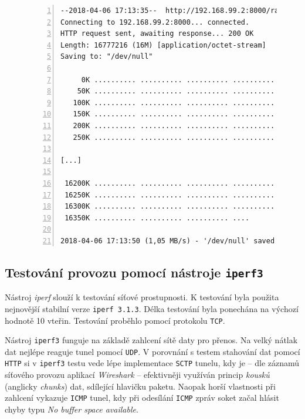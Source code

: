 \documentclass[thesis=M,czech]{FITthesis}[2012/10/20]
\begin{document}
    
    \begin{figure}[h]
	\begin{lstlisting}[label=code:wget,caption=Ukázkový výstup příkazu \texttt{wget},frame=single,numbers=left,linewidth=1.1\textwidth]
--2018-04-06 17:13:35--  http://192.168.99.2:8000/random.16
Connecting to 192.168.99.2:8000... connected.
HTTP request sent, awaiting response... 200 OK
Length: 16777216 (16M) [application/octet-stream]
Saving to: "/dev/null"

     0K .......... .......... .......... .......... ..........  0% 1,01K 17s
    50K .......... .......... .......... .......... ..........  0% 1,07M 16s
   100K .......... .......... .......... .......... ..........  0% 1,04M 15s
   150K .......... .......... .......... .......... ..........  1% 1,07M 15s
   200K .......... .......... .......... .......... ..........  1% 1,07M 15s
   250K .......... .......... .......... .......... ..........  1% 1,04M 15s

[...]

 16200K .......... .......... .......... .......... .......... 99% 1,07M 0s
 16250K .......... .......... .......... .......... .......... 99% 1,04M 0s
 16300K .......... .......... .......... .......... .......... 99% 1,07M 0s
 16350K .......... .......... .......... ....                         100% 1,04M=15s

2018-04-06 17:13:50 (1,05 MB/s) - '/dev/null' saved [16777216/16777216]
      \end{lstlisting}
    \end{figure}

\subsection{Testování provozu pomocí nástroje \texttt{iperf3}}

Nástroj \textit{iperf} slouží k testování síťové prostupnosti. K testování byla použita nejnovější stabilní verze \texttt{iperf 3.1.3}. Délka testování byla ponechána na výchozí hodnotě 10 vteřin. Testování proběhlo pomocí protokolu \texttt{TCP}.

Nástroj \texttt{iperf3} funguje na základě zahlcení sítě daty pro přenos. Na velký nátlak dat nejlépe reaguje tunel pomocí \texttt{UDP}. V porovnání s testem stahování dat pomocí \texttt{HTTP} si v \texttt{iperf3} testu vede lépe implementace \texttt{SCTP} tunelu, kdy je -- dle záznamů síťového provozu aplikací \textit{Wireshark} -- efektivněji využíván princip \textit{kousků} (anglicky \textit{chunks}) dat, sdílející hlavičku paketu. Naopak horší vlastnosti při zahlcení vykazuje \texttt{ICMP} tunel, kdy při odesílání \texttt{ICMP} zpráv soket začal hlásit chyby typu \textit{No buffer space available}.
\end{document}

